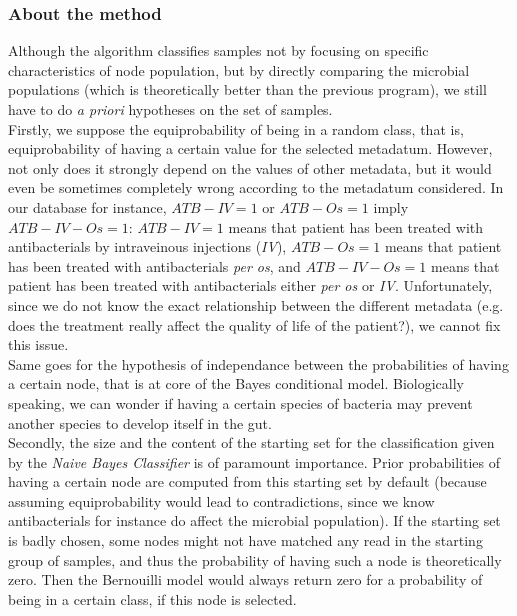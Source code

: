 \documentclass{report}
\begin{document}
\subsubsection{About the method}

Although the algorithm classifies samples not by focusing on specific characteristics of node population, but by directly comparing the microbial populations (which is theoretically better than the previous program), we still have to do \emph{a priori} hypotheses on the set of samples.\\

Firstly, we suppose the equiprobability of being in a random class, that is, equiprobability of having a certain value for the selected metadatum. However, not only does it strongly depend on the values of other metadata, but it would even be sometimes completely wrong according to the metadatum considered. In our database for instance, $ATB-IV = 1$ or $ATB-Os = 1$ imply $ATB-IV-Os = 1$: $ATB-IV = 1$ means that patient has been treated with antibacterials by intraveinous injections (\emph{IV}), $ATB-Os = 1$ means that patient has been treated with antibacterials \emph{per os}, and $ATB-IV-Os = 1$ means that patient has been treated with antibacterials either \emph{per os} or \emph{IV}. Unfortunately, since we do not know the exact relationship between the different metadata (e.g. does the treatment really affect the quality of life of the patient?), we cannot fix this issue.\\

Same goes for the hypothesis of independance between the probabilities of having a certain node, that is at core of the Bayes conditional model. Biologically speaking, we can wonder if having a certain species of bacteria may prevent another species to develop itself in the gut.\\

Secondly, the size and the content of the starting set for the classification given by the \emph{Naive Bayes Classifier} is of paramount importance. Prior probabilities of having a certain node are computed from this starting set by default (because assuming equiprobability would lead to contradictions, since we know antibacterials for instance do affect the microbial population). If the starting set is badly chosen, some nodes might not have matched any read in the starting group of samples, and thus the probability of having such a node is theoretically zero. Then the Bernouilli model would always return zero for a probability of being in a certain class, if this node is selected.\\
\end{document}
